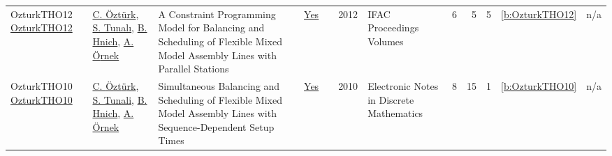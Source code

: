{\begin{longtable}{>{\raggedright\arraybackslash}p{3cm}>{\raggedright\arraybackslash}p{6cm}>{\raggedright\arraybackslash}p{6.5cm}rrrp{2.5cm}rrrrr}
OzturkTHO12 \href{https://www.sciencedirect.com/science/article/pii/S1474667016331858}{OzturkTHO12} & \hyperref[auth:a1028]{C. {\"{O}}zt{\"{u}}rk}, \hyperref[auth:a1029]{S. Tunalı}, \hyperref[auth:a138]{B. Hnich}, \hyperref[auth:a139]{A. {\"{O}}rnek} & A Constraint Programming Model for Balancing and Scheduling of Flexible Mixed Model Assembly Lines with Parallel Stations & \href{../works/OzturkTHO12.pdf}{Yes} & \cite{OzturkTHO12} & 2012 & IFAC Proceedings Volumes & 6 & 5 & 5 & \ref{b:OzturkTHO12} & n/a\\
OzturkTHO10 \href{https://www.sciencedirect.com/science/article/pii/S1571065310000107}{OzturkTHO10} & \hyperref[auth:a136]{C. {\"{O}}zt{\"{u}}rk}, \hyperref[auth:a137]{S. Tunali}, \hyperref[auth:a138]{B. Hnich}, \hyperref[auth:a139]{A. {\"{O}}rnek} & Simultaneous Balancing and Scheduling of Flexible Mixed Model Assembly Lines with Sequence-Dependent Setup Times & \href{../works/OzturkTHO10.pdf}{Yes} & \cite{OzturkTHO10} & 2010 & Electronic Notes in Discrete Mathematics & 8 & 15 & 1 & \ref{b:OzturkTHO10} & n/a\\
\end{longtable}
}

\clearpage

